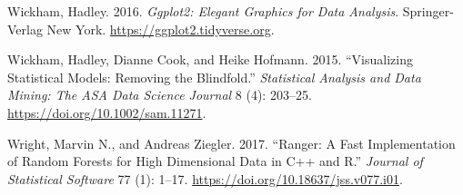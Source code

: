 \documentclass[11pt,twoside]{article}
\newlength{\cslhangindent}
\newlength{\cslentryspacingunit} %
\newenvironment{CSLReferences}[2] %
 {%
  \setlength{\parindent}{0pt}
  \ifodd #1
  \let\oldpar\par
  \def\par{\hangindent=\cslhangindent\oldpar}
  \fi
  \setlength{\parskip}{#2\cslentryspacingunit}
 }%
 {}
\begin{document}
\begin{CSLReferences}{1}{0}
\leavevmode{}%
Wickham, Hadley. 2016. \emph{Ggplot2: {Elegant} {Graphics} for {Data} {Analysis}}. Springer-Verlag New York. \url{https://ggplot2.tidyverse.org}.

\leavevmode{}%
Wickham, Hadley, Dianne Cook, and Heike Hofmann. 2015. {``Visualizing Statistical Models: {Removing} the Blindfold.''} \emph{Statistical Analysis and Data Mining: The ASA Data Science Journal} 8 (4): 203--25. \url{https://doi.org/10.1002/sam.11271}.

\leavevmode{}%
Wright, Marvin N., and Andreas Ziegler. 2017. {``Ranger: {A} {Fast} {Implementation} of {Random} {Forests} for {High} {Dimensional} {Data} in {C}++ and {R}.''} \emph{Journal of Statistical Software} 77 (1): 1--17. \url{https://doi.org/10.18637/jss.v077.i01}.

\end{CSLReferences}




\vskip 0.2in

\end{document}
